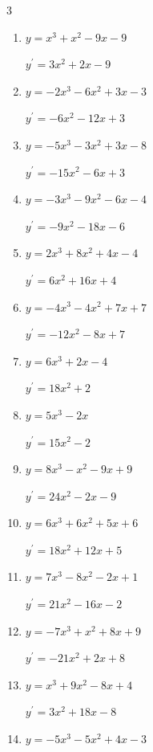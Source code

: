 \begin{multicols}{3}
\begin{enumerate}
  \item $y=x^{3}+x^{2}-9x-9$

        $\displaystyle y^{\prime}=3x^{2}+2x-9$

  \item $y=-2x^{3}-6x^{2}+3x-3$

        $\displaystyle y^{\prime}=-6x^{2}-12x+3$

  \item $y=-5x^{3}-3x^{2}+3x-8$

        $\displaystyle y^{\prime}=-15x^{2}-6x+3$

  \item $y=-3x^{3}-9x^{2}-6x-4$

        $\displaystyle y^{\prime}=-9x^{2}-18x-6$

  \item $y=2x^{3}+8x^{2}+4x-4$

        $\displaystyle y^{\prime}=6x^{2}+16x+4$

  \item $y=-4x^{3}-4x^{2}+7x+7$

        $\displaystyle y^{\prime}=-12x^{2}-8x+7$

  \item $y=6x^{3}+2x-4$

        $\displaystyle y^{\prime}=18x^{2}+2$

  \item $y=5x^{3}-2x$

        $\displaystyle y^{\prime}=15x^{2}-2$

  \item $y=8x^{3}-x^{2}-9x+9$

        $\displaystyle y^{\prime}=24x^{2}-2x-9$

  \item $y=6x^{3}+6x^{2}+5x+6$

        $\displaystyle y^{\prime}=18x^{2}+12x+5$

  \item $y=7x^{3}-8x^{2}-2x+1$

        $\displaystyle y^{\prime}=21x^{2}-16x-2$

  \item $y=-7x^{3}+x^{2}+8x+9$

        $\displaystyle y^{\prime}=-21x^{2}+2x+8$

  \item $y=x^{3}+9x^{2}-8x+4$

        $\displaystyle y^{\prime}=3x^{2}+18x-8$

  \item $y=-5x^{3}-5x^{2}+4x-3$


\end{enumerate}
\end{multicols}

